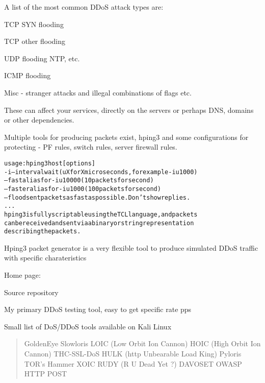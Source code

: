 \documentclass[Screen16to9,17pt]{foils}
\begin{document}

A list of the most common DDoS attack types are:

\begin{list2}
\item TCP SYN flooding
\item TCP other flooding
\item UDP flooding NTP, etc.
\item ICMP flooding
\item Misc - stranger attacks and illegal combinations of flags etc.
\end{list2}

These can affect your services, directly on the servers or perhaps DNS, domains or other dependencies.

Multiple tools for producing packets exist, hping3 and some configurations for protecting - PF rules, switch rules, server firewall rules.




\begin{alltt}\footnotesize
usage: hping3 host [options]
  -i  --interval  wait (uX for X microseconds, for example -i u1000)
      --fast      alias for -i u10000 (10 packets for second)
      --faster    alias for -i u1000 (100 packets for second)
      --flood      sent packets as fast as possible. Don't show replies.
...
hping3 is fully scriptable using the TCL language, and packets
can be received and sent via a binary or string representation
describing the packets.
\end{alltt}

\begin{list2}
\item Hping3 packet generator is a very flexible tool to produce simulated DDoS traffic with specific charateristics
\item Home page: 
\item Source repository 
\end{list2}

\centerline{My primary DDoS testing tool, easy to get specific rate pps}





Small list of DoS/DDoS tools available on Kali Linux
\begin{quote}
GoldenEye
Slowloris
LOIC (Low Orbit Ion Cannon)
HOIC (High Orbit Ion Cannon)
THC-SSL-DoS
HULK (http Unbearable Load King)
Pyloris
TOR's Hammer
XOIC
RUDY (R U Dead Yet ?)
DAVOSET
OWASP HTTP POST
\end{quote}
\end{document}
